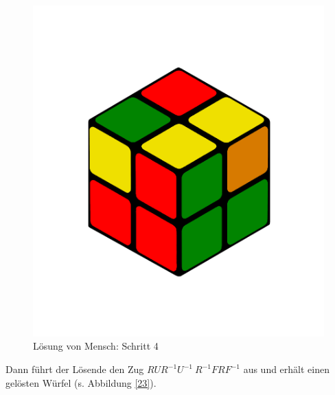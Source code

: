 \documentclass[12pt,a4paper, usenames, dvipsnames]{article}
\begin{document}
\begin{figure}[H]
\centering
\includegraphics[scale=0.12]{menschSchritt4.png}
\caption[Lösung von Mensch: Schritt 4]{Lösung von Mensch: Schritt 4}
\label{22}
\end{figure} 

Dann führt der Lösende den Zug $RUR^{-1}U^{-1} \ R^{-1}FRF^{-1}$ aus \cite{RF2} und erhält einen gelösten Würfel (s. Abbildung \ref{23}). 
\end{document}
